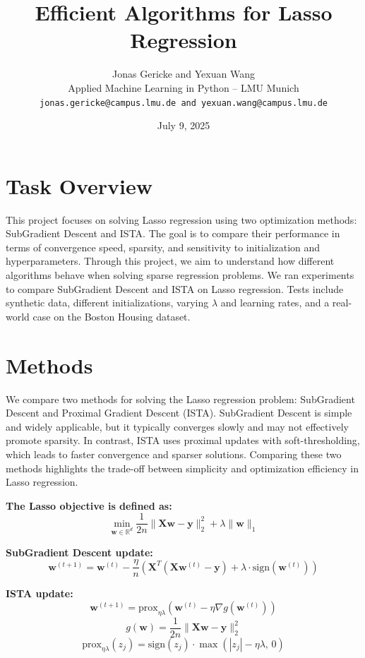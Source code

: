 \documentclass[11pt]{article}
\title{\textbf{Efficient Algorithms for Lasso Regression}}
\author{Jonas Gericke and Yexuan Wang \\
Applied Machine Learning in Python -- LMU Munich \\
\texttt{jonas.gericke@campus.lmu.de and yexuan.wang@campus.lmu.de}}
\date{July 9, 2025}
\begin{document}
\maketitle

\section{Task Overview}

This project focuses on solving Lasso regression using two optimization methods: SubGradient Descent and ISTA. The goal is to compare their performance in terms of convergence speed, sparsity, and sensitivity to initialization and hyperparameters.
Through this project, we aim to understand how different algorithms behave when solving sparse regression problems.
We ran experiments to compare SubGradient Descent and ISTA on Lasso regression. Tests include synthetic data, different initializations, varying \(\lambda\) and learning rates, and a real-world case on the Boston Housing dataset.

\section{Methods}

We compare two methods for solving the Lasso regression problem: SubGradient Descent and Proximal Gradient Descent (ISTA).
SubGradient Descent is simple and widely applicable, but it typically converges slowly and may not effectively promote sparsity. In contrast, ISTA uses proximal updates with soft-thresholding, which leads to faster convergence and sparser solutions. Comparing these two methods highlights the trade-off between simplicity and optimization efficiency in Lasso regression.

\noindent\textbf{The Lasso objective is defined as:}
\[
    \min_{\mathbf{w} \in \mathbb{R}^d} \frac{1}{2n} \|\mathbf{Xw} - \mathbf{y}\|_2^2 + \lambda \|\mathbf{w}\|_1
\]

\noindent\textbf{SubGradient Descent update:}
\[
    \mathbf{w}^{(t+1)} = \mathbf{w}^{(t)} - \frac{\eta}{n} \left( \mathbf{X}^T ( \mathbf{X} \mathbf{w}^{(t)} - \mathbf{y}) + \lambda \cdot \text{sign}(\mathbf{w}^{(t)}) \right)
\]

\noindent\textbf{ISTA update:}
\[
    \mathbf{w}^{(t+1)} = \text{prox}_{\eta \lambda} \left( \mathbf{w}^{(t)} - \eta \nabla g(\mathbf{w}^{(t)}) \right)
\]
\[
    g(\textbf{w}) = \frac{1}{2n} \| \textbf{X} \textbf{w} - \textbf{y} \|_2^2
\]
\[
    \text{prox}_{\eta \lambda}(z_j) = \text{sign}(z_j) \cdot \max\left( |z_j| - \eta \lambda, \, 0 \right)
\]
\end{document}
